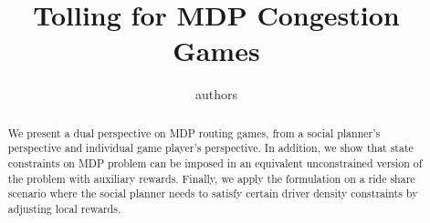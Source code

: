 \documentclass[conference]{IEEEtran}
\begin{document}
\title{Tolling for MDP Congestion Games}
\author{authors}
\maketitle
\begin{abstract}
We present a dual perspective on MDP routing games, from a social planner's perspective and individual game player's perspective. In addition, we show that state constraints on MDP  problem can be imposed in an equivalent unconstrained version of the problem with auxiliary rewards. Finally, we apply the formulation on a ride share scenario where the social planner needs to satisfy certain driver density constraints by adjusting local rewards. 
\end{abstract}









\end{document}
